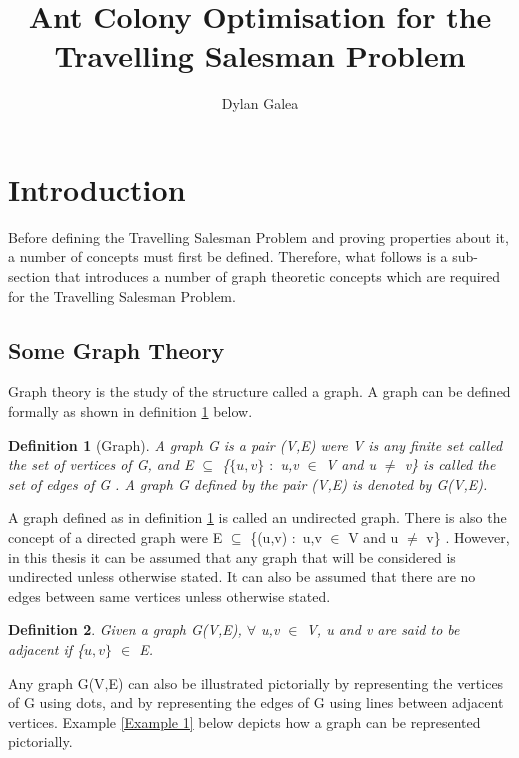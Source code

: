 \documentclass{article}
\title{Ant Colony Optimisation for the Travelling Salesman Problem}
\author{Dylan Galea}
\newtheorem{definition}{Definition}[subsection]
\begin{document}
\maketitle
\newpage
\tableofcontents
\newpage
\section{Introduction}
Before defining the Travelling Salesman Problem and proving properties about it, a number of concepts must first be defined. Therefore, what follows is a sub-section that introduces a number of graph theoretic concepts which are required for the Travelling Salesman Problem.
\subsection{Some Graph Theory}
Graph theory is the study of the structure called a graph. A graph can be defined formally as shown in definition \ref{Graph} below.
\begin{definition}[Graph]
\label{Graph}
A graph G is a pair (V,E) were V is any finite set called the set of vertices of G, and E $\subseteq$ \{$\{u,v\}$ $:$ u,v $\in$ V and u $\neq$ v\} is called the set of edges of G {}. A graph G defined by the pair (V,E) is denoted by G(V,E).
\end{definition}
A graph defined as in definition \ref{Graph} is called an undirected graph. There is also the concept of a directed graph were E $\subseteq$ \{(u,v) $:$ u,v $\in$ V and u $\neq$ v\} \cite{black_tanenbaum_2017}. However, in this thesis it can be assumed that any graph that will be considered is undirected unless otherwise stated. It can also be assumed that there are no edges between same vertices unless otherwise stated.
\begin{definition}
\label{adjacent}
Given a graph G(V,E), $\forall$ u,v $\in$ V, u and v are said to be adjacent if \{$u,v\}$ $\in$ E. 
\end{definition}
Any graph G(V,E) can also be illustrated pictorially by representing the vertices of G using dots, and by representing the edges of G using lines between adjacent vertices. Example \ref{Example 1} below depicts how a graph can be represented pictorially.
\end{document}
